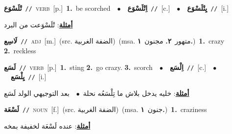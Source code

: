 \documentclass[10pt,a4paper,twoside]{article} %
\begin{document}
\begin{multicols}{2}
{\setlength\topsep{0pt}\textbf{\foreignlanguage{arabic}{تْلَسْوَع}}\ {\color{gray}\texttt{//}\color{black}}\ \textsc{verb}\ [p.]\ \textbf{1.}~be scorched\ \ $\bullet$\ \ \setlength\topsep{0pt}\textbf{\foreignlanguage{arabic}{اِتْلَسْوَع}}\ {\color{gray}\texttt{//}\color{black}}\ [c.]\ \ $\bullet$\ \ \setlength\topsep{0pt}\textbf{\foreignlanguage{arabic}{يِتْلَسْوَع}}\ {\color{gray}\texttt{//}\color{black}}\ [i.]\  \begin{flushright}\color{gray}\foreignlanguage{arabic}{\textbf{\underline{\foreignlanguage{arabic}{أمثلة}}}: تْلَسْوَعت من البرد}\end{flushright}\color{black}} \vspace{2mm}

{\setlength\topsep{0pt}\textbf{\foreignlanguage{arabic}{لَاسِع}}\ {\color{gray}\texttt{//}\color{black}}\ \textsc{adj}\ [m.]\ (src. \color{gray}\foreignlanguage{arabic}{الضفة الغربية}\color{black})\ \color{gray}(msa. \foreignlanguage{arabic}{متهور}~\foreignlanguage{arabic}{\textbf{٢.}}  \foreignlanguage{arabic}{مجنون}~\foreignlanguage{arabic}{\textbf{١.}})\color{black}\ \textbf{1.}~crazy  \textbf{2.}~reckless\ } \vspace{2mm}

{\setlength\topsep{0pt}\textbf{\foreignlanguage{arabic}{لَسَع}}\ {\color{gray}\texttt{//}\color{black}}\ \textsc{verb}\ [p.]\ \textbf{1.}~sting  \textbf{2.}~go crazy.  \textbf{3.}~scorch\ \ $\bullet$\ \ \setlength\topsep{0pt}\textbf{\foreignlanguage{arabic}{اِلْسَع}}\ {\color{gray}\texttt{//}\color{black}}\ [c.]\ \ $\bullet$\ \ \setlength\topsep{0pt}\textbf{\foreignlanguage{arabic}{يِلْسَع}}\ {\color{gray}\texttt{//}\color{black}}\ [i.]\  \begin{flushright}\color{gray}\foreignlanguage{arabic}{\textbf{\underline{\foreignlanguage{arabic}{أمثلة}}}: خليه يدخل بلاش ما تِلْسَعُه نحلة\ $\bullet$\ \  بعد التوجيهي الولد لَسَع}\end{flushright}\color{black}} \vspace{2mm}

{\setlength\topsep{0pt}\textbf{\foreignlanguage{arabic}{لَسْعَة}}\ {\color{gray}\texttt{//}\color{black}}\ \textsc{noun}\ [f.]\ (src. \color{gray}\foreignlanguage{arabic}{الضفة الغربية}\color{black})\ \color{gray}(msa. \foreignlanguage{arabic}{جنون}~\foreignlanguage{arabic}{\textbf{١.}})\color{black}\ \textbf{1.}~craziness\  \begin{flushright}\color{gray}\foreignlanguage{arabic}{\textbf{\underline{\foreignlanguage{arabic}{أمثلة}}}: عنده لَسْعَة لخفيفة بمخه}\end{flushright}\color{black}} \vspace{2mm}


\end{multicols}
\end{document}
